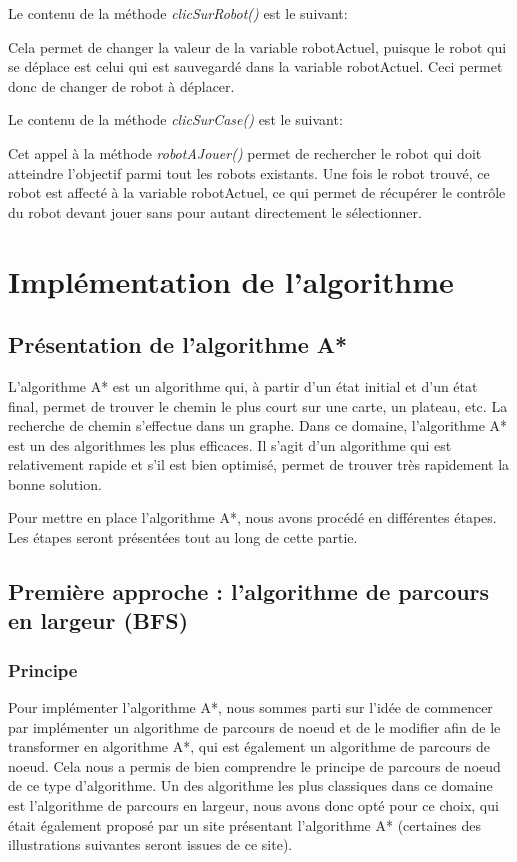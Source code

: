 \documentclass[a4paper, 12pt]{article}
\begin{document}
            Le contenu de la méthode \textit{clicSurRobot()} est le suivant: 
            
            Cela permet de changer la valeur de la variable robotActuel, puisque le robot qui se déplace est celui qui est sauvegardé dans la variable robotActuel. Ceci permet donc de changer de robot à déplacer. 
            
            Le contenu de la méthode \textit{clicSurCase()} est le suivant:
            
            Cet appel à la méthode \textit{robotAJouer()} permet de rechercher le robot qui doit atteindre l'objectif parmi tout les robots existants. Une fois le robot trouvé, ce robot est affecté à la variable robotActuel, ce qui permet de récupérer le contrôle du robot devant jouer sans pour autant directement le sélectionner.
         

\newpage %

\section{Implémentation de l'algorithme}
    \subsection{Présentation de l'algorithme A*}
    
    L'algorithme A*\cite{WikiAstar} est un algorithme qui, à partir d'un état initial et d'un état final, permet de trouver le chemin le plus court sur une carte, un plateau, etc. La recherche de chemin s'effectue dans un graphe. Dans ce domaine, l'algorithme A* est un des algorithmes les plus efficaces. Il s'agit d'un algorithme qui est relativement rapide et s'il est bien optimisé, permet de trouver très rapidement la bonne solution. 
    
    Pour mettre en place l'algorithme A*, nous avons procédé en différentes étapes. Les étapes seront présentées tout au long de cette partie.  
     
    \subsection{Première approche : l'algorithme de parcours en largeur (BFS)}
        \subsubsection{Principe}
            Pour implémenter l'algorithme A*, nous sommes parti sur l'idée de commencer par implémenter un algorithme de parcours de noeud et de le modifier afin de le transformer en algorithme A*, qui est également un algorithme de parcours de noeud. Cela nous a permis de bien comprendre le principe de parcours de noeud de ce type d'algorithme. Un des algorithme les plus classiques dans ce domaine est l'algorithme de parcours en largeur, nous avons donc opté pour ce choix, qui était également proposé par un site présentant l'algorithme A*\cite{redblob} (certaines des illustrations suivantes seront issues de ce site).
            
\end{document}
